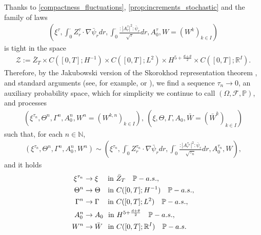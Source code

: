 \documentclass[a4paper,10pt]{amsart}
\newcommand{\N}{\mathbb{N}}
\newcommand{\R}{\mathbb{R}}
\newcommand{\wick}[1]{:\mathrel{#1}:}
\theoremstyle{remark}
\numberwithin{equation}{section}
\begin{document}
Thanks to \cref{compactness_fluctuations}, \cref{prop:increments_stochastic} and \cite[Theorem 23.7]{kallenberg2002}
the family of laws 
\begin{align*}
    \left(\xi^{\tau},\int_0^\cdot Z^{\tau}_r\cdot\nabla\bar{\psi}_r dr,\int_0^\cdot \frac{\wick{|A^\tau_r|^2}\bar{\psi}_r}{\sqrt{\tau}}dr,A^\tau_0,W=(W^{k})_{k\in I}\right)
\end{align*}
is tight in the space
\begin{align*}
    \mathcal{Z}:=\bar{Z}_T\times  C([0,T];H^{-1})\times C([0,T];L^{2})\times H^{5+\frac{d+\theta}{2}}\times  C([0,T];\R^I).
\end{align*}
Therefore, by the Jakubowski version of the Skorokhod representation theorem
\cite{jakubowski1998almost,Brzezniak_skoro}, and standard arguments (see, for
example, \cite[Chapter 2]{flandoli2023stochastic} or
\cite[Section 5.3]{brzezniak2013existence}), we find a sequence
$\tau_n\rightarrow 0$,
an auxiliary probability space, which for simplicity we continue to call
$(\Omega,\mathcal{F},\mathbb{P})$, and processes
\begin{align*}
(\xi^{\tau_n},\Theta^n, \Gamma^n, A^{n}_0,W^n=(W^{k,n})_{k\in I}),\ (\xi,\Theta, \Gamma, A_0,\bar{W}=(\bar{W}^{k})_{k\in I})
\end{align*}
such that, for each $n\in\N$,
\begin{align*}
(\xi^{\tau_n},\Theta^n, \Gamma^n, A^{n}_0,W^n)\sim \left(\xi^{\tau_n},\int_0^\cdot Z^{\tau_n}_r\cdot\nabla\bar{\psi}_r dr,\int_0^\cdot \frac{\wick{|A^{\tau_n}_r|^2}\bar{\psi}_r}{\sqrt{\tau_n}}dr,A^{\tau_n}_0,W\right),\end{align*}
and it holds
\begin{align}
 \xi^{\tau_n}&\rightarrow \xi\quad\text{ in }\bar{Z}_T\quad \mathbb{P}-a.s.,\label{convergence_xi}\\
 \Theta^n&\rightarrow \Theta\quad\hspace{-0.1cm}\text{ in } C([0,T];H^{-1})\quad \mathbb{P}-a.s.,\label{convergence_theta}\\
 \Gamma^n&\rightarrow \Gamma\quad\hspace{-0.05cm}\text{ in } C([0,T];L^2)\quad \mathbb{P}-a.s.,\label{convergence_gamma}\\
 A^{n}_0&\rightarrow A_0 \quad\hspace{-0.23cm}\text{ in }H^{5+\frac{d+\theta}{2}}\quad \mathbb{P}-a.s.,\notag\\
 W^n&\rightarrow \bar{W} \quad\hspace{-0.2cm}\text{ in }C([0,T];\R^I)\quad \mathbb{P}-a.s.\notag
\end{align}
\end{document}
